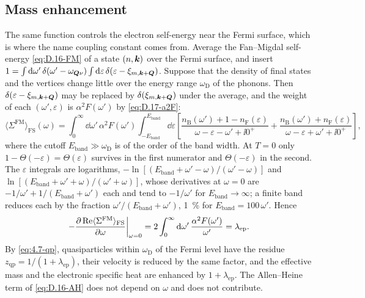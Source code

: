 \subsection*{Mass enhancement}

The same function controls the electron self-energy near the Fermi surface, which is where the name coupling constant comes from. Average the Fan--Migdal self-energy \cref{eq:D.16-FM} of a state $(n,\bm{k})$ over the Fermi surface, and insert $1 = \int\mathrm{d}\omega'\,\delta(\omega' - \omega_{\bm{Q}\nu})\int\mathrm{d}\varepsilon\,\delta(\varepsilon - \xi_{m,\bm{k}+\bm{Q}})$. Suppose that the density of final states and the vertices change little over the energy range $\omega_{\mathrm{D}}$ of the phonons. Then $\delta(\varepsilon - \xi_{m,\bm{k}+\bm{Q}})$ may be replaced by $\delta(\xi_{m,\bm{k}+\bm{Q}})$ under the average, and the weight of each $(\omega',\varepsilon)$ is $\alpha^2F(\omega')$ by \cref{eq:D.17-a2F}:
\begin{equation*}
  \langle\Sigma^{\mathrm{FM}}\rangle_{\mathrm{FS}}(\omega) = \int_0^\infty\dd\omega'\,\alpha^2F(\omega')\int_{-E_{\mathrm{band}}}^{E_{\mathrm{band}}}\dd\varepsilon\left[\frac{n_{\mathrm{B}}(\omega') + 1 - n_{\mathrm{F}}(\varepsilon)}{\omega - \varepsilon - \omega' + \ii0^+} + \frac{n_{\mathrm{B}}(\omega') + n_{\mathrm{F}}(\varepsilon)}{\omega - \varepsilon + \omega' + \ii0^+}\right] ,
\end{equation*}
where the cutoff $E_{\mathrm{band}} \gg \omega_{\mathrm{D}}$ is of the order of the band width. At $T = 0$ only $1 - \Theta(-\varepsilon) = \Theta(\varepsilon)$ survives in the first numerator and $\Theta(-\varepsilon)$ in the second. The $\varepsilon$ integrals are logarithms, $-\ln[(E_{\mathrm{band}} + \omega' - \omega)/(\omega' - \omega)]$ and $\ln[(E_{\mathrm{band}} + \omega' + \omega)/(\omega' + \omega)]$, whose derivatives at $\omega = 0$ are $-1/\omega' + 1/(E_{\mathrm{band}} + \omega')$ each and tend to $-1/\omega'$ for $E_{\mathrm{band}} \to \infty$; a finite band reduces each by the fraction $\omega'/(E_{\mathrm{band}} + \omega')$, \SI{1}{\percent} for $E_{\mathrm{band}} = 100\,\omega'$. Hence
\begin{equation}
  -\frac{\partial\operatorname{Re}\langle\Sigma^{\mathrm{FM}}\rangle_{\mathrm{FS}}}{\partial\omega}\bigg|_{\omega=0} = 2\int_0^\infty\mathrm{d}\omega'\,\frac{\alpha^2F(\omega')}{\omega'} = \lambda_{\mathrm{ep}} .
  \label{eq:D.17-mass}
\end{equation}
By \cref{eq:4.7-qp}, quasiparticles within $\omega_{\mathrm{D}}$ of the Fermi level have the residue $z_{\mathrm{qp}} = 1/(1 + \lambda_{\mathrm{ep}})$, their velocity is reduced by the same factor, and the effective mass and the electronic specific heat are enhanced by $1 + \lambda_{\mathrm{ep}}$. The Allen--Heine term of \cref{eq:D.16-AH} does not depend on $\omega$ and does not contribute.

